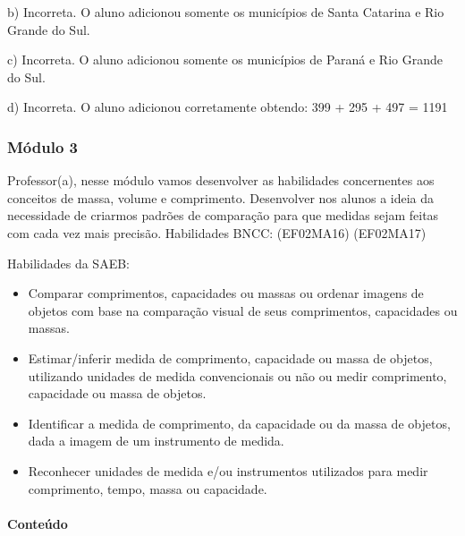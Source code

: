 b) Incorreta. O aluno adicionou somente os municípios de Santa Catarina
e Rio Grande do Sul.

c) Incorreta. O aluno adicionou somente os municípios de Paraná e Rio
Grande do Sul.

d) Incorreta. O aluno adicionou corretamente obtendo: 399 + 295 + 497 =
1191

\subsubsection{Módulo 3 }\label{muxf3dulo-3}

Professor(a), nesse módulo vamos desenvolver as habilidades concernentes
aos conceitos de massa, volume e comprimento. Desenvolver nos alunos a
ideia da necessidade de criarmos padrões de comparação para que medidas
sejam feitas com cada vez mais precisão. Habilidades BNCC: (EF02MA16)
(EF02MA17)

Habilidades da SAEB:

\begin{itemize}
\item
  Comparar comprimentos, capacidades ou massas ou ordenar imagens de
  objetos com base na comparação visual de seus comprimentos,
  capacidades ou massas.
\end{itemize}

\begin{itemize}
\item
  Estimar/inferir medida de comprimento, capacidade ou massa de objetos,
  utilizando unidades de medida convencionais ou não ou medir
  comprimento, capacidade ou massa de objetos.
\end{itemize}

\begin{itemize}
\item
  Identificar a medida de comprimento, da capacidade ou da massa de
  objetos, dada a imagem de um instrumento de medida.
\end{itemize}

\begin{itemize}
\item
  Reconhecer unidades de medida e/ou instrumentos utilizados para medir
  comprimento, tempo, massa ou capacidade.
\end{itemize}

\paragraph{Conteúdo}\label{conteuxfado-2}

